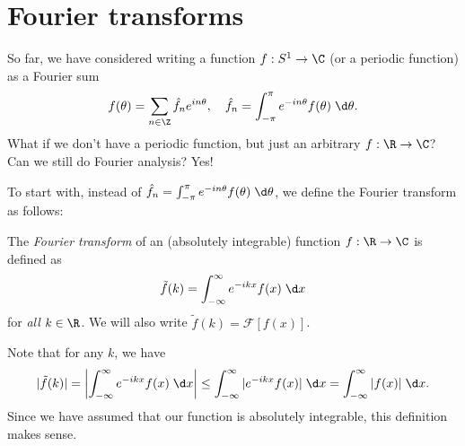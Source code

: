 \documentclass[a4paper]{article}
\begin{document}
\section{Fourier transforms}
So far, we have considered writing a function $f: S^1 \to \C$ (or a periodic function) as a Fourier sum
\[
  f(\theta) = \sum_{n \in \Z} \hat{f}_n e^{in\theta},\quad \hat{f}_n = \int_{-\pi}^\pi e^{-in\theta}f(\theta)\;\d \theta.
\]
What if we don't have a periodic function, but just an arbitrary $f:\R \to \C$? Can we still do Fourier analysis? Yes!

To start with, instead of $\hat{f}_n = \int_{-\pi}^\pi e^{-in\theta }f(\theta)\;\d \theta$, we define the Fourier transform as follows:
\begin{defi}
  The \emph{Fourier transform} of an (absolutely integrable) function $f: \R \to \C$ is defined as
  \[
    \tilde{f}(k) = \int_{-\infty}^\infty e^{-ikx}f(x)\;\d x
  \]
  for \emph{all} $k \in \R$. We will also write $\tilde{f}(k) = \mathcal{F}[f(x)]$.
\end{defi}
Note that for any $k$, we have
\[
  |\tilde{f}(k)| = \left|\int_{-\infty}^\infty e^{-ikx}f(x)\;\d x\right| \leq \int_{-\infty}^\infty |e^{-ikx} f(x)|\;\d x = \int_{-\infty}^\infty  |f(x)|\;\d x.
\]
Since we have assumed that our function is absolutely integrable, this definition makes sense.
\end{document}
